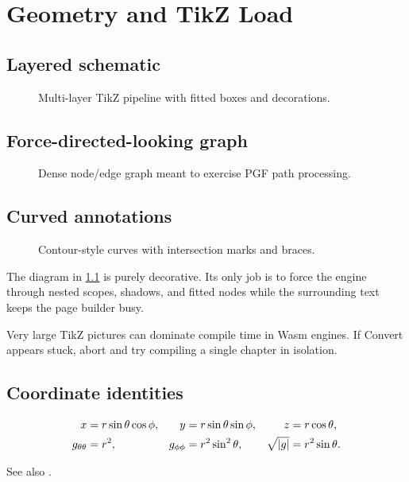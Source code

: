 \chapter{Geometry and TikZ Load}
\label{ch:geometry}

\section{Layered schematic}
\begin{figure}[ht]
\centering

\caption{Multi-layer TikZ pipeline with fitted boxes and decorations.}
\label{fig:pipeline}
\end{figure}

\section{Force-directed-looking graph}
\begin{figure}[ht]
\centering

\caption{Dense node/edge graph meant to exercise PGF path processing.}
\label{fig:meshgraph}
\end{figure}

\section{Curved annotations}
\begin{figure}[ht]
\centering

\caption{Contour-style curves with intersection marks and braces.}
\label{fig:contours}
\end{figure}

\begin{example}
The diagram in \cref{fig:pipeline} is purely decorative. Its only job is to
force the engine through nested scopes, shadows, and fitted nodes while the
surrounding text keeps the page builder busy.
\end{example}

\begin{hippowarn}
Very large TikZ pictures can dominate compile time in Wasm engines. If Convert
appears stuck, abort and try compiling a single chapter in isolation.
\end{hippowarn}

\section{Coordinate identities}
\begin{align}
x &= r\sin\theta\cos\phi, &
y &= r\sin\theta\sin\phi, &
z &= r\cos\theta,
\\
g_{\theta\theta} &= r^{2}, &
g_{\phi\phi} &= r^{2}\sin^{2}\theta, &
\sqrt{\left\lvert g\right\rvert} &= r^{2}\sin\theta.
\end{align}

See also \cite{DoCarmo1976,Lee2013}.
